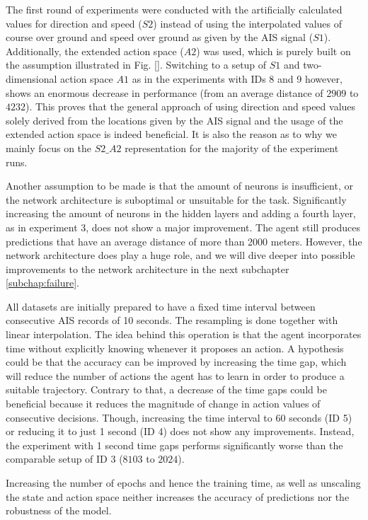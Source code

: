 The first round of experiments were conducted with the artificially calculated values for direction and speed ($S2$) instead of using the interpolated values of course over ground and speed over ground as given by the AIS signal ($S1$). Additionally, the extended action space ($A2$) was used, which is purely built on the assumption illustrated in Fig. \ref{}. Switching to a setup of $S1$ and two-dimensional action space $A1$ as in the experiments with IDs 8 and 9 however, shows an enormous decrease in performance (from an average distance of $2909$ to $4232$). This proves that the general approach of using direction and speed values solely derived from the locations given by the AIS signal and the usage of the extended action space is indeed beneficial. It is also the reason as to why we mainly focus on the $S2\_A2$ representation for the majority of the experiment runs.
\par
Another assumption to be made is that the amount of neurons is insufficient, or the network architecture is suboptimal or unsuitable for the task. Significantly increasing the amount of neurons in the hidden layers and adding a fourth layer, as in experiment 3, does not show a major improvement. The agent still produces predictions that have an average distance of more than 2000 meters. However, the network architecture does play a huge role, and we will dive deeper into possible improvements to the network architecture in the next subchapter \ref{subchap:failure}.
\par
All datasets are initially prepared to have a fixed time interval between consecutive AIS records of 10 seconds. The resampling is done together with linear interpolation. The idea behind this operation is that the agent incorporates time without explicitly knowing whenever it proposes an action. A hypothesis could be that the accuracy can be improved by increasing the time gap, which will reduce the number of actions the agent has to learn in order to produce a suitable trajectory. Contrary to that, a decrease of the time gaps could be beneficial because it reduces the magnitude of change in action values of consecutive decisions. Though, increasing the time interval to 60 seconds (ID 5) or reducing it to just 1 second (ID 4) does not show any improvements. Instead, the experiment with 1 second time gaps performs significantly worse than the comparable setup of ID 3 ($8103$ to $2024$).
\par
Increasing the number of epochs and hence the training time, as well as unscaling the state and action space neither increases the accuracy of predictions nor the robustness of the model.

